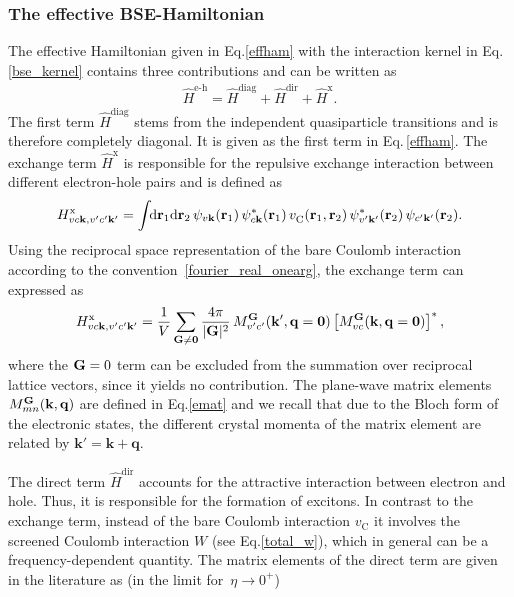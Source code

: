 \subsubsection{The effective BSE-Hamiltonian}\label{subsec_bseham}
The effective Hamiltonian given in Eq.\;\eqref{effham} with the interaction kernel in Eq.\;\eqref{bse_kernel} contains three contributions and can be written as 
%
\begin{align}
    \hat{H}^\text{e-h} = \hat{H}^\text{diag} + \hat{H}^\text{dir} + \hat{H}^\text{x}.
\end{align}
 The first term $\hat{H}^\text{diag}$ stems from the independent quasiparticle transitions and is therefore completely diagonal. It is given as the first term in Eq.\,\eqref{effham}. The exchange term  $\hat{H}^\text{x}$ is responsible for the repulsive exchange interaction between different electron-hole pairs and is defined as 
%
\begin{align}\label{x_term}
     H^\text{x}_{vc\mathbf{k},v'c'\mathbf{k}'} = \int\text{\!\!d}\mathbf{r}_1\text{d}\mathbf{r}_2\,\psi_{v\mathbf{k}}(\mathbf{r}_1)\,\psi^*_{c\mathbf{k}}(\mathbf{r}_1)\,v_\text{C}^{\phantom{I}}(\mathbf{r}_1,\mathbf{r}_2)\,\psi^*_{v'\mathbf{k}'}(\mathbf{r}_2)\,\psi_{c'\mathbf{k}'}(\mathbf{r}_2).
\end{align}
Using the reciprocal space representation of the bare Coulomb interaction according to the convention~\eqref{fourier_real_onearg}, the exchange term  can expressed as
%
\begin{align}
    H^\text{x}_{vc\mathbf{k},v'c'\mathbf{k}'}  = \frac{1}{V}\sum_{\mathbf{G\neq0}}\frac{4\pi}{|\mathbf{G}|^2}\,M^{\mathbf{G}}_{v'c'}(\mathbf{k',q=0})\left[M^{\mathbf{G}}_{vc}(\mathbf{k,q=0})\right]^*,
\end{align}
where the $\mathbf{G}=0$ term can be excluded from the summation over reciprocal lattice vectors, since it yields no contribution. The plane-wave matrix elements $M^{\mathbf{G}}_{mn}(\mathbf{k,q})$ are defined in Eq.\;\eqref{emat} and we recall that due to the Bloch form of the electronic states, the different crystal momenta of the matrix element are related by $\mathbf{k'=k+q}$.\par
The direct term $\hat{H}^\text{dir}$ accounts for the attractive interaction between electron and hole. Thus, it is responsible for the formation of excitons. In contrast to the exchange term, instead of the bare Coulomb interaction $v_\text{C}^{\phantom{I}}$ it involves the screened Coulomb interaction $W$ (see Eq.\;\eqref{total_w}), which in general can be a frequency-dependent quantity.
\newpage
The matrix elements of the direct term  are given in the literature\cite{rohlf_louie_2000,rohlf_louie_dynscreen98,strinati1988application} as (in the limit for~$\eta\rightarrow0^+$)
